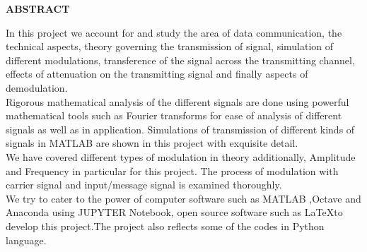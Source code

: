 \documentclass[12pt,a4paper]{article}%
\begin{document}
	\begin{center}
		\textbf{\large ABSTRACT}
	\end{center}
    \begin{flushleft}
    	\fontsize{12pt}{18pt}\selectfont
    	 In this project we account for and study the area of data communication, the technical aspects, theory governing the transmission of signal, simulation of different modulations, transference of the signal across the transmitting channel, effects of attenuation on the transmitting signal and finally aspects of demodulation.\\\bigskip
    	 Rigorous mathematical analysis of the different signals are done using powerful mathematical tools such as Fourier transforms for ease of analysis of
    	 different signals as well as in application. Simulations of transmission of different kinds of signals in MATLAB are shown in this project with exquisite detail.\\\bigskip
    	 We have covered different types of modulation in theory additionally, Amplitude and Frequency in particular for this project. The process of modulation with carrier signal
    	 and input/message signal is examined thoroughly.\\\bigskip
    	 We try to cater to the power of computer software such as MATLAB ,Octave and Anaconda using JUPYTER Notebook, open source software such as \LaTeX  to develop this project.The project also reflects some of the codes in Python language.
	\end{flushleft}
	
	\pagebreak
	\tableofcontents
	\pagebreak
	\cleardoublepage
\end{document}
